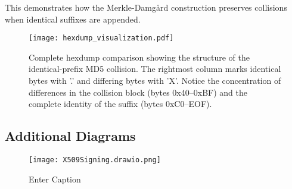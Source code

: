 \documentclass[runningheads]{llncs}
\begin{document}
    This demonstrates how the Merkle-Damgård construction preserves collisions when identical suffixes are appended.

    \begin{figure}[p]
        \centering
        \texttt{[image: hexdump\_visualization.pdf]}
        \caption{Complete hexdump comparison showing the structure of the identical-prefix MD5 collision. The rightmost column marks identical bytes with '.' and differing bytes with 'X'. Notice the concentration of differences in the collision block (bytes 0x40--0xBF) and the complete identity of the suffix (bytes 0xC0--EOF).}
        \label{fig:hexdump-full}
    \end{figure}

    \clearpage

    \subsection{Additional Diagrams}

    \begin{figure}
        \centering
        \texttt{[image: X509Signing.drawio.png]}
        \caption{Enter Caption}
        \label{fig:x509-signing}
    \end{figure}
\end{document}
